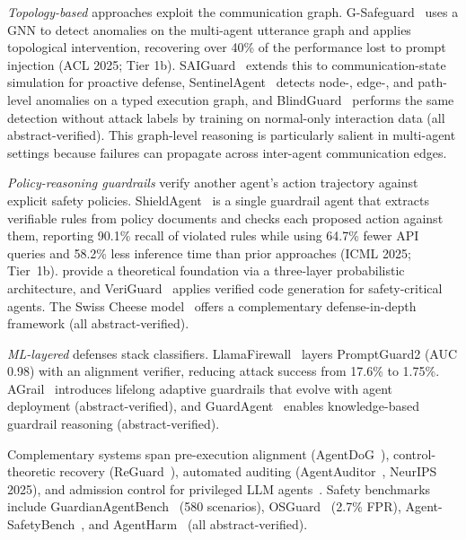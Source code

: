 \emph{Topology-based} approaches exploit the communication graph. G-Safeguard~\cite{gsafeguard2025} uses a GNN to detect anomalies on the multi-agent utterance graph and applies topological intervention, recovering over 40\% of the performance lost to prompt injection (ACL 2025; Tier 1b). SAIGuard~\cite{saiguard2026} extends this to communication-state simulation for proactive defense, SentinelAgent~\cite{sentinelagent2025} detects node-, edge-, and path-level anomalies on a typed execution graph, and BlindGuard~\cite{blindguard2025} performs the same detection without attack labels by training on normal-only interaction data (all abstract-verified). This graph-level reasoning is particularly salient in multi-agent settings because failures can propagate across inter-agent communication edges.

\emph{Policy-reasoning guardrails} verify another agent's action trajectory against explicit safety policies. ShieldAgent~\cite{shieldagent2025} is a single guardrail agent that extracts verifiable rules from policy documents and checks each proposed action against them, reporting 90.1\% recall of violated rules while using 64.7\% fewer API queries and 58.2\% less inference time than prior approaches (ICML 2025; Tier~1b). \cite{probabilisticarchitecture2026} provide a theoretical foundation via a three-layer probabilistic architecture, and VeriGuard~\cite{veriguard2025} applies verified code generation for safety-critical agents. The Swiss Cheese model~\cite{swisscheese2025} offers a complementary defense-in-depth framework (all abstract-verified).

\emph{ML-layered} defenses stack classifiers. LlamaFirewall~\cite{llamafirewall2025} layers PromptGuard2 (AUC 0.98) with an alignment verifier, reducing attack success from 17.6\% to 1.75\%. AGrail~\cite{agrail2025} introduces lifelong adaptive guardrails that evolve with agent deployment (abstract-verified), and GuardAgent~\cite{guardagent2024} enables knowledge-based guardrail reasoning (abstract-verified).

Complementary systems span pre-execution alignment (AgentDoG~\cite{agentdog2026}), control-theoretic recovery (ReGuard~\cite{pandya2025}), automated auditing (AgentAuditor~\cite{agentauditor2025}, NeurIPS 2025), and admission control for privileged LLM agents~\cite{zhu2026leaseguard}. Safety benchmarks include GuardianAgentBench~\cite{guardianagentbench2026} (580 scenarios), OSGuard~\cite{osguard2026} (2.7\% FPR), Agent-SafetyBench~\cite{agentsafetybench2024}, and AgentHarm~\cite{agentharm2024} (all abstract-verified).


